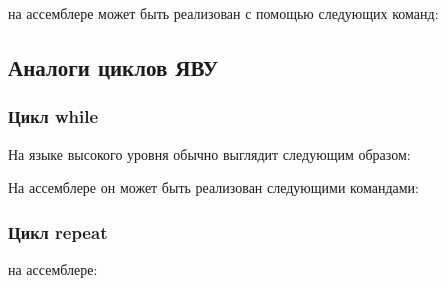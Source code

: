 на ассемблере {\MyProc} может быть реализован с помощью следующих команд:
\begin{algorithmic}[1]
    \STATE{}
    \STATE{}
\end{algorithmic}


\subsection{Аналоги циклов ЯВУ}

\subsubsection{Цикл while}

На языке высокого уровня обычно выглядит следующим образом:
\begin{algorithmic}[1]
        \STATE{} 
    \ENDWHILE
\end{algorithmic}

На ассемблере он может быть реализован следующими командами:
\begin{algorithmic}[1]
    \STATE{}
\end{algorithmic}


\subsubsection{Цикл repeat}

\begin{algorithmic}[1]
    \REPEAT
        \STATE{} 
\end{algorithmic}

на ассемблере:
\begin{algorithmic}[1]
    \STATE{}
\end{algorithmic}


